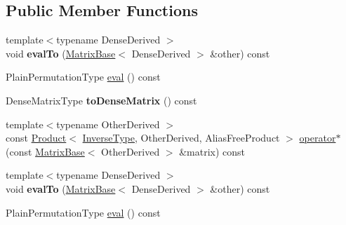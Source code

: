 \subsection*{Public Member Functions}
\begin{DoxyCompactItemize}
\item 
\mbox{\label{class_eigen_1_1_inverse_impl_3_01_permutation_type_00_01_permutation_storage_01_4_a15b46084ae2bff6f2ee7f257ed15352f}} 
{\footnotesize template$<$typename Dense\+Derived $>$ }\\void {\bfseries eval\+To} (\hyperlink{group___core___module_class_eigen_1_1_matrix_base}{Matrix\+Base}$<$ Dense\+Derived $>$ \&other) const
\item 
Plain\+Permutation\+Type \hyperlink{class_eigen_1_1_inverse_impl_3_01_permutation_type_00_01_permutation_storage_01_4_a9048319f60dc98831ddfd25a5f7d69a7}{eval} () const
\item 
\mbox{\label{class_eigen_1_1_inverse_impl_3_01_permutation_type_00_01_permutation_storage_01_4_a17d9216ffff2de32c56b6ff82a3c2a9d}} 
Dense\+Matrix\+Type {\bfseries to\+Dense\+Matrix} () const
\item 
{\footnotesize template$<$typename Other\+Derived $>$ }\\const \hyperlink{group___core___module_class_eigen_1_1_product}{Product}$<$ \hyperlink{class_eigen_1_1_inverse}{Inverse\+Type}, Other\+Derived, Alias\+Free\+Product $>$ \hyperlink{class_eigen_1_1_inverse_impl_3_01_permutation_type_00_01_permutation_storage_01_4_abf863c3bf5bde58cead077f335bfff3a}{operator$\ast$} (const \hyperlink{group___core___module_class_eigen_1_1_matrix_base}{Matrix\+Base}$<$ Other\+Derived $>$ \&matrix) const
\item 
\mbox{\label{class_eigen_1_1_inverse_impl_3_01_permutation_type_00_01_permutation_storage_01_4_a15b46084ae2bff6f2ee7f257ed15352f}} 
{\footnotesize template$<$typename Dense\+Derived $>$ }\\void {\bfseries eval\+To} (\hyperlink{group___core___module_class_eigen_1_1_matrix_base}{Matrix\+Base}$<$ Dense\+Derived $>$ \&other) const
\item 
Plain\+Permutation\+Type \hyperlink{class_eigen_1_1_inverse_impl_3_01_permutation_type_00_01_permutation_storage_01_4_a9048319f60dc98831ddfd25a5f7d69a7}{eval} () const

\end{DoxyCompactItemize}
